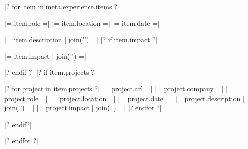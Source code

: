 

\begin{cventries}

|? for item in meta.experience.items ?|

\cventry
  {|= item.role =|} %
  {} %
  {|= item.location =|} %
  {|= item.date =|} %
  {%
|= item.description | join('\n') =|
|? if item.impact ?|
    \vspace{4mm}
    \color{lightgray}
    \begin{cvitems} %
      \item{
|= item.impact | join('\n') =|
      }
    \end{cvitems}
|? endif ?|
|? if item.projects ?|
    \vspace{2mm}
    \begin{cvprojects}
|? for project in item.projects ?|
      \cvproject
        {|= project.url =|}
        {|= project.company =|}
        {|= project.role =|}
        {|= project.location =|}
        {|= project.date =|}
        {%
|= project.description | join('\n') =|
        }
        {%
|= project.impact | join('\n') =|
        }
|? endfor ?|
    \end{cvprojects}
|? endif?|
  }

|? endfor ?|
\end{cventries}
